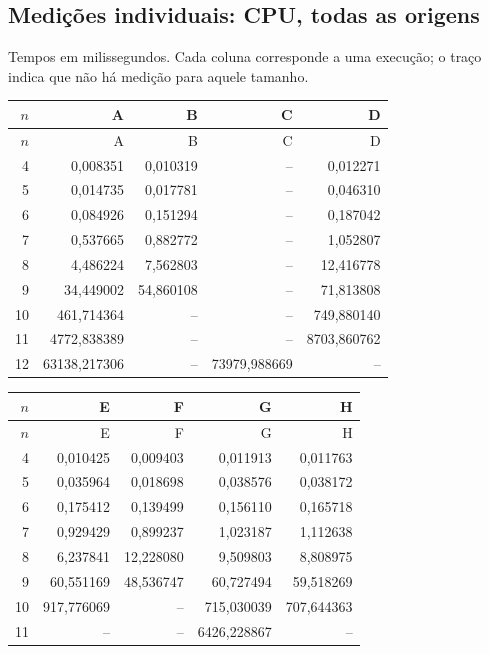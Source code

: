 \subsection{Medições individuais: CPU, todas as origens}
Tempos em milissegundos. Cada coluna corresponde a uma execução; o traço indica que não há medição para aquele tamanho.
\begingroup\small\setlength{\tabcolsep}{4pt}
\begin{longtable}{rrrrr}
\toprule
$n$ & A & B & C & D \\
\midrule\endfirsthead
\toprule $n$ & A & B & C & D \\
\midrule\endhead
4 & 0,008351 & 0,010319 & -- & 0,012271 \\
5 & 0,014735 & 0,017781 & -- & 0,046310 \\
6 & 0,084926 & 0,151294 & -- & 0,187042 \\
7 & 0,537665 & 0,882772 & -- & 1,052807 \\
8 & 4,486224 & 7,562803 & -- & 12,416778 \\
9 & 34,449002 & 54,860108 & -- & 71,813808 \\
10 & 461,714364 & -- & -- & 749,880140 \\
11 & 4772,838389 & -- & -- & 8703,860762 \\
12 & 63138,217306 & -- & 73979,988669 & -- \\
\bottomrule
\end{longtable}
\endgroup
\begingroup\small\setlength{\tabcolsep}{4pt}
\begin{longtable}{rrrrr}
\toprule
$n$ & E & F & G & H \\
\midrule\endfirsthead
\toprule $n$ & E & F & G & H \\
\midrule\endhead
4 & 0,010425 & 0,009403 & 0,011913 & 0,011763 \\
5 & 0,035964 & 0,018698 & 0,038576 & 0,038172 \\
6 & 0,175412 & 0,139499 & 0,156110 & 0,165718 \\
7 & 0,929429 & 0,899237 & 1,023187 & 1,112638 \\
8 & 6,237841 & 12,228080 & 9,509803 & 8,808975 \\
9 & 60,551169 & 48,536747 & 60,727494 & 59,518269 \\
10 & 917,776069 & -- & 715,030039 & 707,644363 \\
11 & -- & -- & 6426,228867 & -- \\
\bottomrule
\end{longtable}
\endgroup
\begingroup\small\setlength{\tabcolsep}{4pt}
